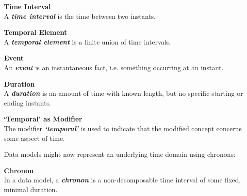 \begin{svgraybox}
\vspace{-10pt}
\begin{definition}\textbf{Time Interval}\\
A \emph{\textbf{time interval}} is the time between two instants.
\end{definition}

\begin{definition}\textbf{Temporal Element}\\
A \emph{\textbf{temporal element}} is a finite union of time intervals.
\end{definition}

\begin{definition}\textbf{Event}\\
An \emph{\textbf{event}} is an instantaneous fact, i.e. something occurring at an instant.
\end{definition}

\begin{definition}\textbf{Duration}\\
A \emph{\textbf{duration}} is an amount of time with known length, but no specific starting or ending instants.
\end{definition}

\begin{definition}\textbf{`Temporal' as Modifier}\\
The modifier \emph{\textbf{`temporal'}} is used to indicate that the modified concept concerns some aspect of time.
\end{definition}
\vspace{-10pt}
\end{svgraybox}


Data models might now represent an underlying time domain using chronons:

\begin{svgraybox}
\vspace{-10pt}
\begin{definition}\textbf{Chronon}\\
In a data model, a \emph{\textbf{chronon}} is a non-decomposable time interval of some fixed, minimal duration.
\end{definition}
\vspace{-10pt}
\end{svgraybox}

